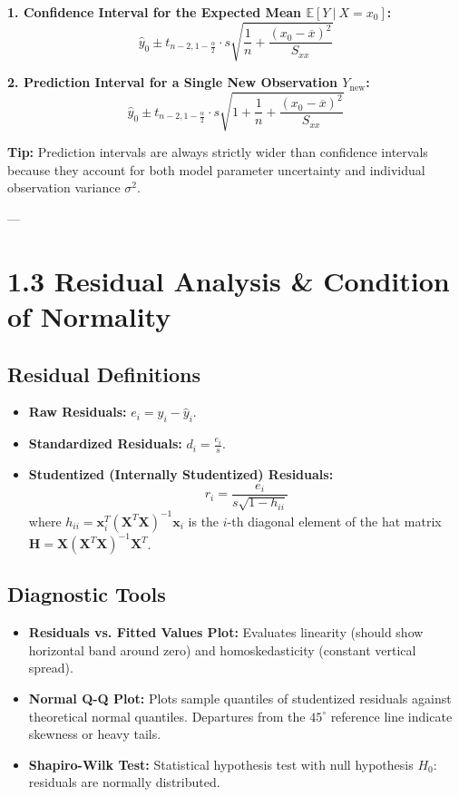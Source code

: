 \documentclass[
]{article}
\begin{document}
\textbf{1. Confidence Interval for the Expected Mean
\(\mathbb{E}\left\lbrack Y~|~X = x_{0} \right\rbrack\):}
\[{\hat{y}}_{0} \pm t_{n - 2,1 - \frac{\alpha}{2}} \cdot s\sqrt{\frac{1}{n} + \frac{\left( x_{0} - \overline{x} \right)^{2}}{S_{xx}}}\]

\textbf{2. Prediction Interval for a Single New Observation
\(Y_{\text{new}}\):}
\[{\hat{y}}_{0} \pm t_{n - 2,1 - \frac{\alpha}{2}} \cdot s\sqrt{1 + \frac{1}{n} + \frac{\left( x_{0} - \overline{x} \right)^{2}}{S_{xx}}}\]

\textbf{Tip: } Prediction intervals are always strictly wider than
confidence intervals because they account for both model parameter
uncertainty and individual observation variance \(\sigma^{2}\).

---

\textbf{ }

\section{1.3 Residual Analysis \& Condition of Normality}

\textbf{ }

\subsection{Residual Definitions}

\begin{itemize}
\item
  \textbf{Raw Residuals:} \(e_{i} = y_{i} - {\hat{y}}_{i}\).
\item
  \textbf{Standardized Residuals:} \(d_{i} = \frac{e_{i}}{s}\).
\item
  \textbf{Studentized (Internally Studentized) Residuals:}
  \[r_{i} = \frac{e_{i}}{s\sqrt{1 - h_{ii}}}\] where
  \(h_{ii} = \mathbf{x}_{i}^{T}\left( \mathbf{X}^{T}\mathbf{X} \right)^{- 1}\mathbf{x}_{i}\)
  is the \(i\)-th diagonal element of the hat matrix
  \(\mathbf{H} = {\mathbf{X}(\mathbf{X}^{T}\mathbf{X})}^{- 1}\mathbf{X}^{T}\).
\end{itemize}

\textbf{ }

\subsection{Diagnostic Tools}

\begin{itemize}
\item
  \textbf{Residuals vs. Fitted Values Plot:} Evaluates linearity (should
  show horizontal band around zero) and homoskedasticity (constant
  vertical spread).
\item
  \textbf{Normal Q-Q Plot:} Plots sample quantiles of studentized
  residuals against theoretical normal quantiles. Departures from the
  \(45^{\circ}\) reference line indicate skewness or heavy tails.
\item
  \textbf{Shapiro-Wilk Test:} Statistical hypothesis test with null
  hypothesis \(H_{0}\): residuals are normally distributed.
\end{itemize}
\end{document}
